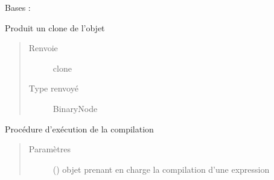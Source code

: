 \documentclass[letterpaper,10pt,french]{sphinxmanual}
\begin{document}
\begin{fulllineitems}
\label{\detokenize{arithmeticexpressionnodes:arithmeticexpressionnodes.ValueNode}}
Bases : {\hyperref[\detokenize{arithmeticexpressionnodes:arithmeticexpressionnodes.ArithmeticExpressionNode}]{}}

\begin{fulllineitems}
\label{\detokenize{arithmeticexpressionnodes:arithmeticexpressionnodes.ValueNode.clone}}
Produit un clone de l’objet
\begin{quote}\begin{description}
\item[{Renvoie}] \leavevmode
clone

\item[{Type renvoyé}] \leavevmode
BinaryNode

\end{description}\end{quote}

\end{fulllineitems}


\begin{fulllineitems}
\label{\detokenize{arithmeticexpressionnodes:arithmeticexpressionnodes.ValueNode.compile}}
Procédure d’exécution de la compilation
\begin{quote}\begin{description}
\item[{Paramètres}] \leavevmode
{} ({\hyperref[\detokenize{compileexpressionmanager:compileexpressionmanager.CompileExpressionManager}]{}}) \textendash{} objet prenant en charge la compilation d’une expression


\end{description}
\end{quote}
\end{fulllineitems}
\end{fulllineitems}
\end{document}
